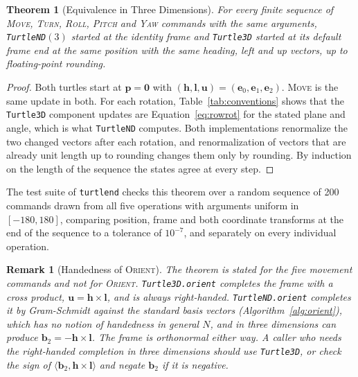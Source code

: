 \documentclass[11pt,letterpaper]{article}
\newtheorem{theorem}{Theorem}[section]
\newtheorem{remark}{Remark}[section]
\newcommand{\pos}{\mathbf{p}}
\newcommand{\basis}{\mathbf{b}}
\newcommand{\std}{\mathbf{e}}
\newcommand{\code}[1]{\texttt{#1}}
\newcommand{\op}[1]{\textup{\textsc{#1}}}
\begin{document}
\begin{theorem}[Equivalence in Three Dimensions]
\label{thm:compat}
For every finite sequence of \op{Move}, \op{Turn},
\op{Roll}, \op{Pitch} and \op{Yaw} commands with the same
arguments, \code{TurtleND}$(3)$ started at the identity frame and
\code{Turtle3D} started at its default frame end at the same position
with the same heading, left and up vectors, up to floating-point
rounding.
\end{theorem}

\begin{proof}
Both turtles start at $\pos = \mathbf{0}$ with
$(\mathbf{h}, \mathbf{l}, \mathbf{u}) = (\std_0, \std_1, \std_2)$.
\op{Move} is the same update in both. For each rotation,
Table~\ref{tab:conventions} shows that the \code{Turtle3D} component
updates are Equation~\eqref{eq:rowrot} for the stated plane and angle,
which is what \code{TurtleND} computes. Both implementations renormalize
the two changed vectors after each rotation, and renormalization of
vectors that are already unit length up to rounding changes them only
by rounding. By induction on the length of the sequence the states
agree at every step.
\end{proof}

The test suite of \code{turtlend} checks this theorem over a random
sequence of 200 commands drawn from all five operations with arguments
uniform in $[-180, 180]$, comparing position, frame and both coordinate
transforms at the end of the sequence to a tolerance of $10^{-7}$, and
separately on every individual operation.

\begin{remark}[Handedness of \op{Orient}]
\label{rem:handed}
The theorem is stated for the five movement commands and not for
\op{Orient}. \code{Turtle3D.orient} completes the frame with a
cross product, $\mathbf{u} = \mathbf{h} \times \mathbf{l}$, and is
always right-handed. \code{TurtleND.orient} completes it by
Gram-Schmidt against the standard basis vectors
(Algorithm~\ref{alg:orient}), which has no notion of handedness in
general $N$, and in three dimensions can produce
$\basis_2 = -\mathbf{h} \times \mathbf{l}$. The frame is orthonormal
either way. A caller who needs the right-handed completion in three
dimensions should use \code{Turtle3D}, or check the sign of
$\langle \basis_2, \mathbf{h} \times \mathbf{l} \rangle$ and negate
$\basis_2$ if it is negative.
\end{remark}

\end{document}
